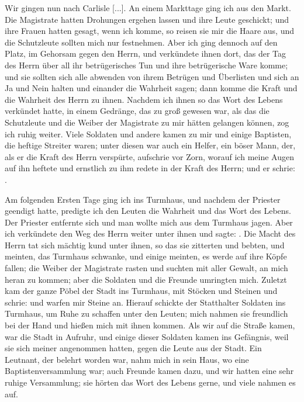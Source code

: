 Wir gingen nun nach Carlisle [...]. An einem Markttage
ging ich aus den Markt. Die Magistrate hatten Drohungen 
ergehen lassen und ihre Leute geschickt; und ihre Frauen hatten
gesagt, wenn ich komme, so reisen sie mir die Haare aus, und
die Schutzleute sollten mich nur festnehmen. Aber ich ging dennoch
auf den Platz, im Gehorsam gegen den Herrn, und verkündete
ihnen dort, das der Tag des Herrn 
über all ihr betrügerisches
Tun und ihre betrügerische Ware komme; und sie sollten sich alle
abwenden von ihrem Betrügen und Überlisten und sich an Ja
und Nein halten und einander die Wahrheit sagen; dann komme
die Kraft und die Wahrheit des Herrn zu ihnen. Nachdem ich
ihnen so das Wort des Lebens verkündet hatte, in einem 
Gedränge, das zu groß gewesen war, als das die Schutzleute und
die Weiber der Magistrate zu mir hätten gelangen können, zog
ich ruhig weiter. Viele Soldaten und andere kamen zu mir und
einige Baptisten, die heftige Streiter 
waren; unter diesen war
auch ein Helfer, ein böser Mann, der, als er die Kraft des Herrn
verspürte, aufschrie vor Zorn, worauf ich meine Augen auf ihn
heftete und ernstlich zu ihm redete in der Kraft des Herrn; und
er schrie: .

Am folgenden Ersten Tage ging ich ins Turmhaus, und
nachdem der Priester geendigt hatte, predigte ich den Leuten
die Wahrheit und das Wort des Lebens. Der Priester entfernte
sich und man wollte mich aus dem Turmhaus jagen. Aber ich
verkündete den Weg des Herrn weiter unter ihnen und sagte:
. Die Macht des Herrn tat sich mächtig kund unter
ihnen, so das sie zitterten und bebten, 
und meinten, das Turmhaus schwanke, und einige meinten, 
es werde auf ihre Köpfe fallen;
die Weiber der Magistrate rasten und suchten mit aller Gewalt,
an mich heran zu kommen; aber die Soldaten und die Freunde
umringten mich. Zuletzt kam der ganze Pöbel der Stadt ins
Turmhaus, mit Stöcken und Steinen und schrie:  und warfen mir Steine an.
Hierauf schickte der Statthalter Soldaten ins Turmhaus, um
Ruhe zu schaffen unter den Leuten; mich nahmen sie freundlich
bei der Hand und hießen mich mit ihnen kommen. Als wir
auf die Straße kamen, war die Stadt in Aufruhr, und einige
dieser Soldaten kamen ins Gefängnis, weil sie sich meiner 
angenommen hatten, gegen die Leute aus der Stadt. Ein Leutnant,
der belehrt worden war, nahm mich in sein Haus, wo eine 
Baptistenversammlung 
war; auch Freunde kamen dazu, und wir hatten
eine sehr ruhige Versammlung; 
sie hörten das Wort des Lebens
gerne, und viele nahmen es auf. 

